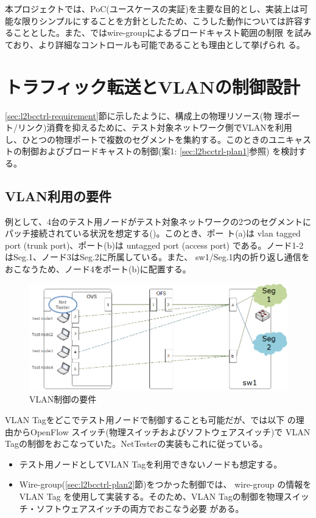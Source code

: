 本プロジェクトでは、PoC(ユースケースの実証)を主要な目的とし、実装上は可
能な限りシンプルにすることを方針としたため、こうした動作については許容す
ることとした。また、\lopj ではwire-groupによるブロードキャスト範囲の制限
を試みており、より詳細なコントロールも可能であることも理由として挙げられ
る。


 \section{トラフィック転送とVLANの制御設計}
 \label{sec:vlan-ctrl}

\ref{sec:l2bcctrl-requirement}節に示したように、構成上の物理リソース(物
理ポート/リンク)消費を抑えるために、テスト対象ネットワーク側でVLANを利用
し、ひとつの物理ポートで複数のセグメントを集約する。このときのユニキャス
トの制御およびブロードキャストの制御(案1: \ref{sec:l2bcctrl-plan1}参照)
を検討する。

  \subsection{VLAN利用の要件}
  \label{sec:vlan-ctrl-req}

例として、4台のテスト用ノードがテスト対象ネットワークの2つのセグメントに
パッチ接続されている状況を想定する()。このとき、ポー
ト(a)は vlan tagged port (trunk port)、ポート(b)は untagged port (access
port) である。ノード1-2はSeg.1、ノード3はSeg.2に所属している。また、
sw1/Seg.1内の折り返し通信をおこなうため、ノード4をポート(b)に配置する。

\begin{figure}[h]
 \centering
 \includegraphics[scale=0.6]{img/vlan-req.png}
 \caption{VLAN制御の要件}
 \label{fig:vlan-req}
\end{figure}

VLAN Tagをどこでテスト用ノードで制御することも可能だが、\lopjc では以下
の理由からOpenFlow スイッチ(物理スイッチおよびソフトウェアスイッチ)で
VLAN Tagの制御をおこなっていた。NetTesterの実装もこれに従っている。
\begin{itemize}
 \item テスト用ノードとしてVLAN Tagを利用できないノードも想定する。
 \item Wire-group(\ref{sec:l2bcctrl-plan2}節)をつかった制御では、
       wire-group の情報をVLAN Tag を使用して実装する。そのため、VLAN
       Tagの制御を物理スイッチ・ソフトウェアスイッチの両方でおこなう必要
       がある。
\end{itemize}

